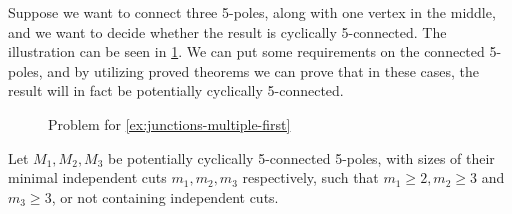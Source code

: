 \documentclass[12pt, twoside]{book}
\begin{document}
\begin{example}\label{ex:junctions-multiple-first}
	Suppose we want to connect three 5-poles, along with one vertex in the middle, and we want to decide whether the result is cyclically 5-connected. The illustration can be seen in \cref{fig:3-5-poles-connected}. We can put some requirements on the connected 5-poles, and by utilizing proved theorems we can prove that in these cases, the result will in fact be potentially cyclically 5-connected.
	
	\begin{figure}
		\centering
		\caption{Problem for \cref{ex:junctions-multiple-first}}
		\label{fig:3-5-poles-connected}
	\end{figure}
	
	Let $M_1,M_2,M_3$ be potentially cyclically 5-connected 5-poles, with sizes of their minimal independent cuts $m_1,m_2,m_3$ respectively, such that $m_1\geq 2,m_2\geq 3$ and $m_3\geq 3$, or not containing independent cuts.
	
	\begin{figure}
		\centering
\end{figure}
\end{example}
\end{document}
